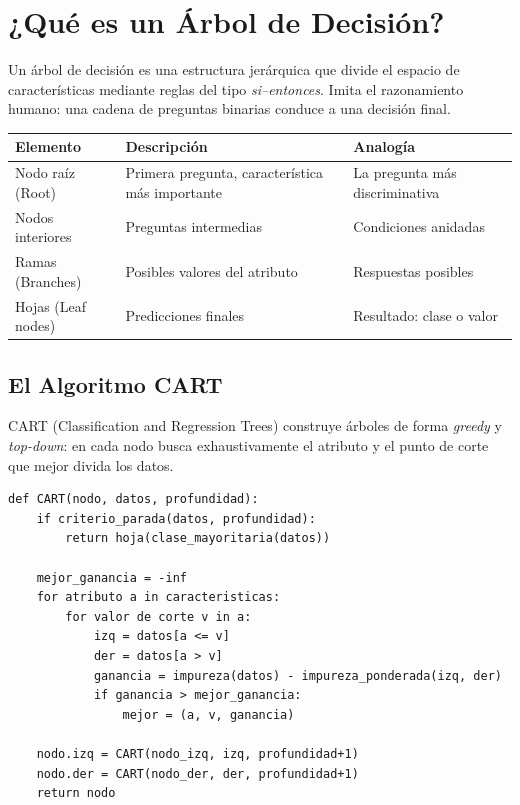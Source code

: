 \documentclass[11pt, a4paper]{book}
\begin{document}
\section{¿Qué es un Árbol de Decisión?}

Un árbol de decisión es una estructura jerárquica que divide el espacio de características mediante
reglas del tipo \textit{si–entonces}. Imita el razonamiento humano: una cadena de preguntas binarias
conduce a una decisión final.

\begin{resumen}
  \begin{tabular}{lll}
    \toprule
    \textbf{Elemento} & \textbf{Descripción} & \textbf{Analogía}\\
    \midrule
    Nodo raíz (Root) & Primera pregunta, característica más importante &
      La pregunta más discriminativa\\
    Nodos interiores & Preguntas intermedias & Condiciones anidadas\\
    Ramas (Branches) & Posibles valores del atributo & Respuestas posibles\\
    Hojas (Leaf nodes) & Predicciones finales & Resultado: clase o valor\\
    \bottomrule
  \end{tabular}
\end{resumen}

\subsection{El Algoritmo CART}

CART (Classification and Regression Trees) construye árboles de forma \textit{greedy} y
\textit{top-down}: en cada nodo busca exhaustivamente el atributo y el punto de corte que
mejor divida los datos.

\begin{lstlisting}[caption={Pseudocódigo CART}]
def CART(nodo, datos, profundidad):
    if criterio_parada(datos, profundidad):
        return hoja(clase_mayoritaria(datos))
    
    mejor_ganancia = -inf
    for atributo a in caracteristicas:
        for valor de corte v in a:
            izq = datos[a <= v]
            der = datos[a > v]
            ganancia = impureza(datos) - impureza_ponderada(izq, der)
            if ganancia > mejor_ganancia:
                mejor = (a, v, ganancia)
    
    nodo.izq = CART(nodo_izq, izq, profundidad+1)
    nodo.der = CART(nodo_der, der, profundidad+1)
    return nodo
\end{lstlisting}
\end{document}
